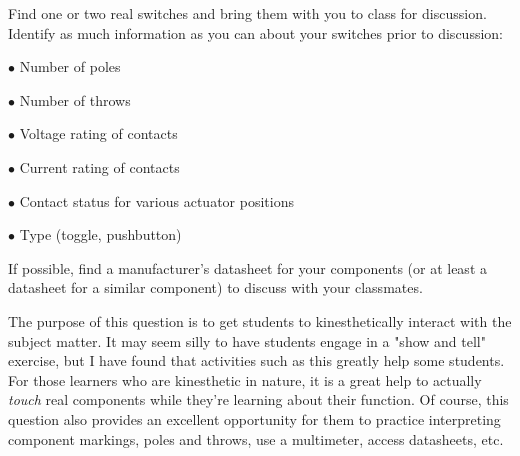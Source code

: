 

Find one or two real switches and bring them with you to class for discussion.  Identify as much information as you can about your switches prior to discussion:

\medskip
\item{$\bullet$} Number of poles
\item{$\bullet$} Number of throws
\item{$\bullet$} Voltage rating of contacts
\item{$\bullet$} Current rating of contacts
\item{$\bullet$} Contact status for various actuator positions
\item{$\bullet$} Type (toggle, pushbutton)
\medskip







If possible, find a manufacturer's datasheet for your components (or at least a datasheet for a similar component) to discuss with your classmates.







The purpose of this question is to get students to kinesthetically interact with the subject matter.  It may seem silly to have students engage in a "show and tell" exercise, but I have found that activities such as this greatly help some students.  For those learners who are kinesthetic in nature, it is a great help to actually {\it touch} real components while they're learning about their function.  Of course, this question also provides an excellent opportunity for them to practice interpreting component markings, poles and throws, use a multimeter, access datasheets, etc.




